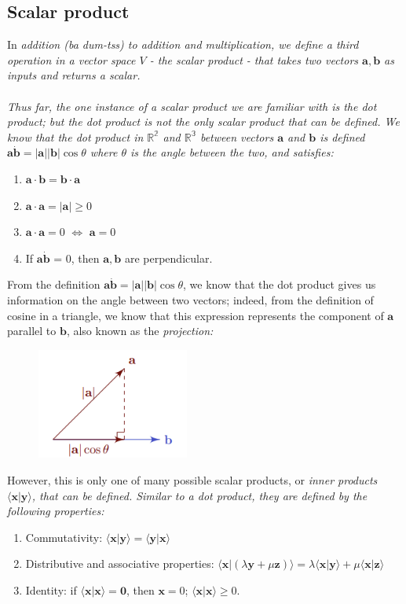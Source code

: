 \documentclass{article}
\begin{document}
\subsection{Scalar product}
In \it addition \normalfont (ba dum-tss) to addition and multiplication, we define a third operation in a vector space $V$ - the scalar product - that takes two vectors $\mathbf{a, b}$ as inputs and returns a scalar. \\ \\
Thus far, the one instance of a scalar product we are familiar with is the dot product; but the dot product is not the only scalar product that can be defined. We know that the dot product in $\mathbb{R^2}$ and $\mathbb{R^3}$ between vectors $\mathbf{a}$ and $\mathbf{b}$ is defined $\mathbf{a\dot b = |a||b|}\cos\theta$ where $\theta$ is the angle between the two, and satisfies:
\begin{enumerate}
    \item $\mathbf{a\cdot b = b \cdot a}$
    \item $\mathbf{a \cdot a} = |\mathbf{a}| \geq 0$
    \item $\mathbf{a\cdot a} = 0$ $\iff$ $\mathbf{a} = 0$
    \item If $\mathbf{a \dot b}$ = 0, then $\mathbf{a, b}$ are perpendicular.
\end{enumerate}
From the definition $\mathbf{a\dot b = |a||b|}\cos\theta$, we know that the dot product gives us information on the angle between two vectors; indeed, from the definition of cosine in a triangle, we know that this expression represents the component of $\mathbf{a}$ parallel to $\mathbf{b}$, also known as the \it projection\normalfont:
\begin{figure}[h]
    \centering
    \includegraphics[width=5cm]{LA_ch1_dotproduct.png}
\end{figure}
However, this is only one of many possible scalar products, or \it inner products $\langle\mathbf{x|y}\rangle$, \normalfont that can be defined. Similar to a dot product, they are defined by the following properties:
\begin{enumerate}
    \item Commutativity: $\mathbf{\langle x|y\rangle=\langle y|x\rangle}$
    \item Distributive and associative properties: $\langle\mathbf{x}|(\lambda\mathbf{y}+\mu\mathbf{z})\rangle=\lambda\langle\mathbf{x|y}\rangle+ \mu\langle\mathbf{x|z}\rangle$
    \item Identity: if $\mathbf{\langle x|x\rangle=0}$, then $\mathbf{x}=0$; $\mathbf{\langle x|x\rangle}\geq 0$.
\end{enumerate}
\end{document}
